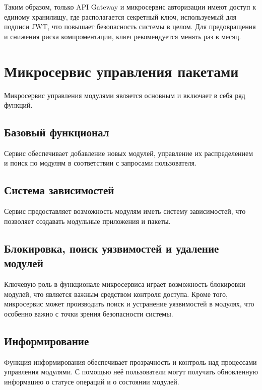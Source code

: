 


Таким образом, только API Gateway и микросервис авторизации имеют доступ к единому хранилищу, где располагается секретный ключ, используемый для подписи JWT, что повышает безопасность системы в целом. Для предовращения и снижения риска компроментации, ключ рекомендуется менять раз в месяц. 

\section{Микросервис управления пакетами}

Микросервис управления модулями является основным и включает в себя ряд функций. 

\subsection{Базовый функционал}
Сервис обеспечивает добавление новых модулей, управление их распределением и поиск по модулям в соответствии с запросами пользователя.

\subsection{Система зависимостей}
Сервис предоставляет возможность модулям иметь систему зависимостей, что позволяет создавать модульные приложения и пакеты.

\subsection{Блокировка, поиск уязвимостей и удаление модулей}
Ключевую роль в функционале микросервиса играет возможность блокировки модулей, что является важным средством контроля доступа. Кроме того, микросервис может производить поиск и устранение уязвимостей в модулях, что особенно важно с точки зрения безопасности системы.

\subsection{Информирование}
Функция информирования обеспечивает прозрачность и контроль над процессами управления модулями. С помощью неё пользователи могут получать обновленную информацию о статусе операций и о состоянии модулей.

